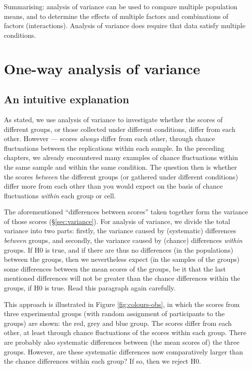 \documentclass[
]{book}
\begin{document}
Summarising: analysis of variance can be used to compare multiple
population means, and to determine the effects of multiple
factors and combinations of factors (interactions).
Analysis of variance does require that data satisfy multiple
conditions.

\hypertarget{one-way-analysis-of-variance}{%
\section{One-way analysis of variance}\label{one-way-analysis-of-variance}}

\hypertarget{sec:anova-oneway-explanation}{%
\subsection{An intuitive explanation}\label{sec:anova-oneway-explanation}}

As stated, we use analysis of variance to investigate whether the
scores of different groups, or those collected under different conditions,
differ from each other. However --- scores \emph{always} differ
from each other, through chance fluctuations between the replications within
each sample. In the preceding chapters, we already encountered
many examples of chance fluctuations within the same sample and within
the same condition. The question then is whether the scores
\emph{between} the different groups (or gathered under different
conditions) differ more from each other than you would expect on the
basis of chance fluctuations \emph{within} each group or cell.

The aforementioned ``differences between scores'' taken together form the
variance of those scores
(§\ref{sec:variance}). For analysis of variance, we divide the total
variance into two parts: firstly, the variance caused by (systematic)
differences \emph{between} groups, and secondly, the variance caused
by (chance) differences \emph{within} groups. If H0 is true,
and if there are thus no differences (in the populations) between the
groups, then we nevertheless expect (in the samples of the groups)
some differences between the mean scores of the groups, be it that
the last mentioned differences will not be greater than
the chance differences within the groups, if H0 is true.
Read this paragraph again carefully.

This approach is illustrated in
Figure \ref{fig:colours-obs}, in which the scores from three experimental
groups (with random assignment of participants to the groups) are shown:
the red, grey and blue group. The scores differ from each other, at least
through chance fluctuations of the scores within
each group. There are probably also systematic differences between (the
mean scores of) the three groups. However, are these systematic
differences now comparatively larger than the chance differences within each
group? If so, then we reject H0.
\end{document}

